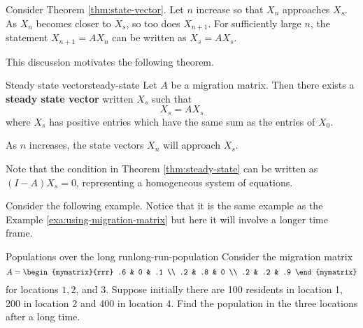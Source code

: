 Consider Theorem \ref{thm:state-vector}. Let $n$ increase so that $X_n$ approaches $X_s$. As $X_n$ becomes closer to $X_s$, so too does $X_{n+1}$. For sufficiently large $n$, the statement $X_{n+1} = AX_n$ can be written as $X_s = AX_s$. 

This discussion motivates the following theorem.

\begin{theorem}{Steady state vector}{steady-state}
Let $A$ be a migration matrix. Then there exists a \textbf{steady state vector} written $X_s$ such that 
\[
X_s = AX_s
\]
where $X_s$ has positive entries which have the same sum as the entries of $X_0$. 

As $n$ increases, the state vectors $X_n$ will approach $X_s$. 
\end{theorem}

Note that the condition in Theorem \ref{thm:steady-state} can be written as $(I - A)X_s=0$, representing a homogeneous system of equations. 

Consider the following example. Notice that it is the same example as the Example \ref{exa:using-migration-matrix} but here it will
involve a longer time frame.

\begin{example}{Populations over the long run}{long-run-population}
Consider the migration matrix 
\begin{equation*}
A
=
\begin{mymatrix}{rrr}
.6 & 0 & .1 \\
.2 & .8 & 0 \\
.2 & .2 & .9
\end{mymatrix} 
\end{equation*}
 for locations $1,2$, and $3$. Suppose initially there are 100
residents in location 1, 200 in location 2 and 400 in location 4. Find the
population in the three locations after a long time.
\end{example}

